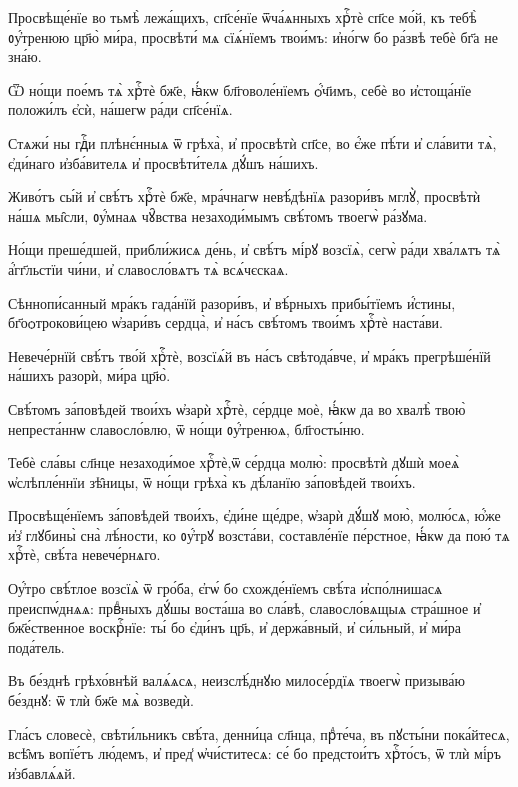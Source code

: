 \hKv Просвѣще́нїе во тьмѣ̀ лежа́щихъ, сп҃се́нїе ѿча́ѧнныхъ  хрⷭ҇тѐ сп҃се мо́й, къ тебѣ̀ ᲂу҆́тренюю цр҃ю̀ ми́ра,  просвѣти́ мѧ сїѧ́нїемъ твои́мъ: и҆но́гѡ бо ра́звѣ тебѐ  бг҃а не зна́ю. 

\hKv Ѿ но́щи пое́мъ тѧ̀ хрⷭ҇тѐ бж҃е, ꙗ҆́кѡ бл҃говоле́нїемъ  ѻ҆́ч҃имъ, себѐ во и҆стоща́нїе положи́лъ є҆сѝ, на́шегѡ  ра́ди сп҃се́нїѧ. 

\hKv Стѧжи́ ны гдⷭ҇и плѣнє́нныѧ ѿ грѣха̀, и҆ просвѣтѝ  сп҃се, во є҆́же пѣ́ти и҆ сла́вити тѧ̀, є҆ди́наго  и҆зба́вителѧ и҆ просвѣти́телѧ дꙋ́шъ на́шихъ. 

\hKv Живо́тъ сы́й и҆ свѣ́тъ хрⷭ҇тѐ бж҃е, мра́чнагѡ невѣ́дѣнїѧ  разори́въ мглꙋ̀, просвѣтѝ на́шѧ мы̑сли, ᲂу҆́мнаѧ чꙋ̑вства  незаходи́мымъ свѣ́томъ твоегѡ̀ ра́зꙋма. 

\hKv Но́щи преше́дшей, прибли́жисѧ де́нь, и҆ свѣ́тъ мі́рꙋ  возсїѧ̀, сегѡ̀ ра́ди хва́лѧтъ тѧ̀ а҆́гг҃льстїи чи́ни, и҆  славосло́вѧтъ тѧ̀ всѧ́чєскаѧ. 
%

\hKv Сѣннопи́санный мра́къ гада́нїй  разори́въ, и҆ вѣ́рныхъ прибы́тїемъ  и҆́стины, бг҃оѻтрокови́цею ѡ҆зари́въ сердца̀, и҆  на́съ свѣ́томъ твои́мъ хрⷭ҇тѐ наста́ви. 

\hKv Невече́рнїй свѣ́тъ тво́й хрⷭ҇тѐ, возсїѧ́й въ на́съ  свѣтода́вче, и҆ мра́къ прегрѣше́нїй на́шихъ разорѝ, ми́ра  цр҃ю̀. 

\hKv Свѣ́томъ за́повѣдей твои́хъ ѡ҆зарѝ хрⷭ҇тѐ, се́рдце моѐ,  ꙗ҆́кѡ да во хвалѣ̀ твою̀ непреста́ннѡ славосло́влю, ѿ  но́щи ᲂу҆́тренюѧ, бл҃госты́ню. 

\hKv Тебѐ сла́вы сл҃нце незаходи́мое хрⷭ҇тѐ,ѿ се́рдца молю̀:  просвѣтѝ дꙋшѝ моеѧ̀ ѡ҆слѣпле́ннїи зѣ̑ницы, ѿ но́щи  грѣха̀ къ дѣ́ланїю за́повѣдей твои́хъ. 

\hKv Просвѣще́нїемъ за́повѣдей твои́хъ, є҆ди́не ще́дре,  ѡ҆зарѝ дꙋ́шꙋ мою̀, молю́сѧ, ю҆́же и҆з̾ глꙋбины̀ сна̀  лѣ́ности, ко ᲂу҆́трꙋ возста́ви, составле́нїе пе́рстное,  ꙗ҆́кѡ да пою́ тѧ хрⷭ҇тѐ, свѣ́та невече́рнѧго. 

\hKv Оу҆́тро свѣ́тлое возсїѧ̀ ѿ гро́ба, є҆гѡ́ бо  схожде́нїемъ свѣ́та и҆спо́лнишасѧ преиспѡ́днѧѧ:  првⷣныхъ дꙋ́шы воста́ша во сла́вѣ,  славосло́вѧщыѧ стра́шное и҆ бж҃е́ственное воскрⷭ҇нїе: ты́ бо  є҆ди́нъ цр҃ь, и҆ держа́вный, и҆ си́льный, и҆ ми́ра  пода́тель. 
%

\hKv Въ бе́зднѣ грѣхо́внѣй валѧ́ѧсѧ, неизслѣ́днꙋю милосе́рдїѧ  твоегѡ̀ призыва́ю бе́зднꙋ: ѿ тлѝ бж҃е мѧ̀ возведѝ. 
%

\hKv Гла́съ словесѐ, свѣти́льникъ свѣ́та,  денни́ца сл҃нца, прⷣте́ча, въ пꙋсты́ни пока́йтесѧ, всѣ̑мъ  вопїе́тъ лю́демъ, и҆ пред̾ ѡ҆чи́ститесѧ: се́ бо предстои́тъ  хрⷭ҇то́съ, ѿ тлѝ мі́ръ и҆збавлѧ́ѧй. 

